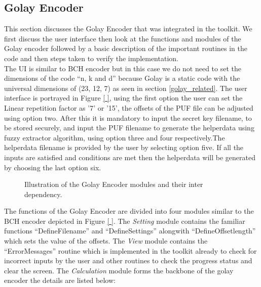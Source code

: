 \subsection{Golay Encoder}
This section discusses the Golay Encoder that was integrated in the toolkit. We first discuss the user interface then look at the functions and modules of the Golay encoder followed by a basic description of the important routines in the code and then steps taken to verify the implementation.\\

The UI is similar to BCH encoder but in this case we do not need to set the dimensions of the code ``n, k and d'' because Golay is a static code with the universal dimensions of (23, 12, 7) as seen in section \ref{golay_related}. The user interface is portrayed in Figure \ref{ }, using the first option the user can set the Linear repetition factor as '7' or '15', the offsets of the PUF file can be adjusted using option two. After this it is mandatory to input the secret key filename, to be
stored securely, and input the PUF filename to generate the helperdata using fuzzy extractor algorithm, using option three and four respectively.The helperdata filename is provided by the user by selecting option five. If all the inputs are satisfied and conditions are met then the helperdata will be generated by choosing the last option six.\\


\begin{figure}
\centering
{}
\caption{Illustration of the Golay Encoder modules and their inter dependency.}
\label{img:gui_design}
\end{figure}

The functions of the Golay Encoder are divided into four modules similar to the BCH encoder depicted in Figure \ref{ }. The \emph{Setting} module contains the familiar functions ``DefineFilename'' and ``DefineSettings'' alongwith ``DefineOffsetlength'' which sets the value of the offsets. The \emph{View} module contains the ``ErrorMessages'' routine which is implemented in the toolkit already to check for incorrect inputs by the user and other routines to check the progress status and
clear the screen. The \emph{Calculation} module forms the backbone of the golay encoder the details are listed below:

